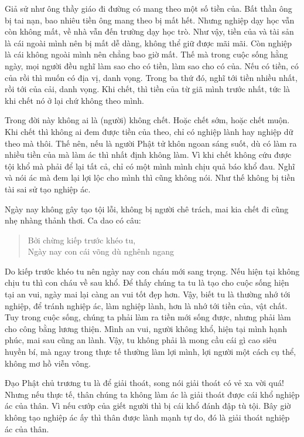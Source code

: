 \documentclass[
  12pt,
  oneside]{book}
\begin{document}
Giả sử như ông thầy giáo đi đường có mang theo một số tiền của. Bất thần ông bị tai nạn, bao nhiêu tiền ông mang theo bị mất hết. Nhưng nghiệp dạy học vẫn còn không mất, về nhà vẫn đến trường dạy học trò. Như vậy, tiền của và tài sản là cái ngoài mình nên bị mất dễ dàng, không thể giữ được mãi mãi. Còn nghiệp là cái không ngoài mình nên chẳng bao giờ mất. Thế mà trong cuộc sống hằng ngày, mọi người đều nghĩ làm sao cho có tiền, làm sao cho có của. Nếu có tiền, có của rồi thì muốn có địa vị, danh vọng. Trong ba thứ đó, nghĩ tới tiền nhiều nhất, rồi tới của cải, danh vọng. Khi chết, thì tiền của từ giã mình trước nhất, tức là khi chết nó ở lại chứ không theo mình.

Trong đời này không ai là (người) không chết. Hoặc chết sớm, hoặc chết muộn. Khi chết thì không ai đem được tiền của theo, chỉ có nghiệp lành hay nghiệp dữ theo mà thôi. Thế nên, nếu là người Phật tử khôn ngoan sáng suốt, dù có làm ra nhiều tiền của mà làm ác thì nhất định không làm. Vì khi chết không cứu được tội khổ mà phải để lại tất cả, chỉ có một mình mình chịu quả báo khổ đau. Nghĩ và nói ác mà đem lại lợi lộc cho mình thì cũng không nói. Như thế không bị tiền tài sai sử tạo nghiệp ác.

Ngày nay không gây tạo tội lỗi, không bị người chê trách, mai kia chết đi cũng nhẹ nhàng thảnh thơi. Ca dao có câu:

\begin{quote}
Bởi chừng kiếp trước khéo tu,\\
Ngày nay con cái võng dù nghênh ngang
\end{quote}

Do kiếp trước khéo tu nên ngày nay con cháu mới sang trọng. Nếu hiện tại không chịu tu thì con cháu về sau khổ. Để thấy chúng ta tu là tạo cho cuộc sống hiện tại an vui, ngày mai lại càng an vui tốt đẹp hơn. Vậy, biết tu là thường nhớ tới nghiệp, để tránh nghiệp ác, làm nghiệp lành, hơn là nhớ tới tiền của, vật chất. Tuy trong cuộc sống, chúng ta phải làm ra tiền mới sống được, nhưng phải làm cho công bằng lương thiện. Mình an vui, người không khổ, hiện tại mình hạnh phúc, mai sau cũng an lành. Vậy, tu không phải là mong cầu cái gì cao siêu huyền bí, mà ngay trong thực tế thường làm lợi mình, lợi người một cách cụ thể, không mơ hồ viễn vông.

Đạo Phật chủ trương tu là để giải thoát, song nói giải thoát có vẻ xa vời quá! Nhưng nếu thực tế, thân chúng ta không làm ác là giải thoát được cái khổ nghiệp ác của thân. Vì nếu cướp của giết người thì bị cái khổ đánh đập tù tội. Bây giờ không tạo nghiệp ác ấy thì thân được lành mạnh tự do, đó là giải thoát nghiệp ác của thân.
\end{document}
